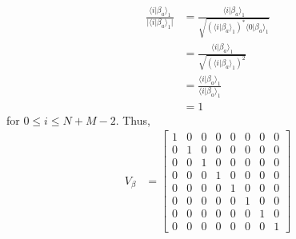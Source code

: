\begin{example}
	\begin{align*}
		\frac{\langle i \vert \beta_{a} \rangle_1}{\vert \langle i \vert \beta_{a} \rangle_1 \vert} &= \frac{\langle i \vert \beta_{a} \rangle_1}{\sqrt{ \left(\langle i \vert \beta_{a} \rangle_1\right)^* \langle 0 \vert \beta_{a} \rangle_1}} \\
		&= \frac{\langle i \vert \beta_{a} \rangle_1}{ \sqrt{ ( \langle i \vert \beta_{a} \rangle_1 )^2} } \\
		&= \frac{\langle i \vert \beta_{a} \rangle_1}{\langle i \vert \beta_{a} \rangle_1} \\
		&= 1
	\end{align*}
for $0 \leq i \leq N+M-2$.
Thus,
	\begin{align*}
		V_\beta &=
		\begin{bmatrix}
			1 & 0 & 0 & 0 & 0 & 0 & 0 & 0 \\
			0 & 1 & 0 & 0 & 0 & 0 & 0 & 0 \\
			0 & 0 & 1 & 0 & 0 & 0 & 0 & 0 \\
			0 & 0 & 0 & 1 & 0 & 0 & 0 & 0 \\
			0 & 0 & 0 & 0 & 1 & 0 & 0 & 0 \\
			0 & 0 & 0 & 0 & 0 & 1 & 0 & 0 \\
			0 & 0 & 0 & 0 & 0 & 0 & 1 & 0 \\
			0 & 0 & 0 & 0 & 0 & 0 & 0 & 1
		\end{bmatrix}
	\end{align*}


\end{example}

